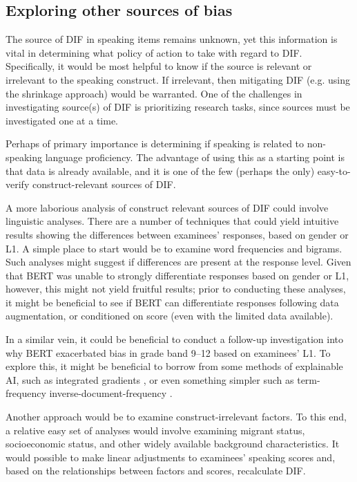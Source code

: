 \documentclass [PhD] {uclathes}
\begin{document}
\subsection{Exploring other sources of bias}

The source of DIF in speaking items remains unknown, yet this information is vital in determining what policy of action to take with regard to DIF. Specifically, it would be most helpful to know if the source is relevant or irrelevant to the speaking construct. If irrelevant, then mitigating DIF (e.g. using the shrinkage approach) would be warranted. One of the challenges in investigating source(s) of DIF is prioritizing research tasks, since sources must be investigated one at a time. 

Perhaps of primary importance is determining if speaking is related to non-speaking language proficiency. The advantage of using this as a starting point is that data is already available, and it is one of the few (perhaps the only) easy-to-verify construct-relevant sources of DIF. 

A more laborious analysis of construct relevant sources of DIF could involve linguistic analyses. There are a number of techniques that could yield intuitive results showing the differences between examinees’ responses, based on gender or L1. A simple place to start would be to examine word frequencies and bigrams. Such analyses might suggest if differences are present at the response level. Given that BERT was unable to strongly differentiate responses based on gender or L1, however, this might not yield fruitful results; prior to conducting these analyses, it might be beneficial to see if BERT can differentiate responses following data augmentation, or conditioned on score (even with the limited data available). 

In a similar vein, it could be beneficial to conduct a follow-up investigation into why BERT exacerbated bias in grade band 9–12 based on examinees’ L1. To explore this, it might be beneficial to borrow from some methods of explainable AI, such as integrated gradients \citep{ormerod2022mapping}, or even something simpler such as term-frequency inverse-document-frequency \citep{jurafskyspeech}.

Another approach would be to examine construct-irrelevant factors. To this end, a relative easy set of analyses would involve examining migrant status, socioeconomic status, and other widely available background characteristics. It would possible to make linear adjustments to examinees’ speaking scores and, based on the relationships between factors and scores, recalculate DIF. 
\end{document}
